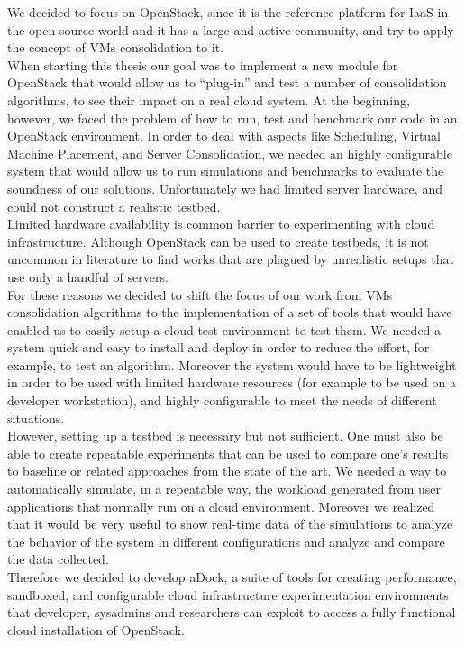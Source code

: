We decided to focus on OpenStack, since it is the reference platform for IaaS in the open-source world and it has a large and active community, and try to apply the concept of VMs consolidation to it.\\ 
When starting this thesis our goal was to implement a new module for OpenStack that would allow us to ``plug-in'' and test a number of consolidation algorithms, to see their impact on a real cloud system. At the beginning, however, we faced the problem of how to run, test and benchmark our code in an OpenStack environment. In order to deal with aspects like Scheduling, Virtual Machine Placement, and Server Consolidation, we needed an highly configurable system that would allow us to run simulations and benchmarks to evaluate the soundness of our solutions. Unfortunately we had limited server hardware, and could not construct a realistic testbed.\\
Limited hardware availability is common barrier to experimenting with cloud infrastructure. Although OpenStack can be used to create testbeds, it is not uncommon in literature to find works that are plagued by unrealistic setups that use only a handful of servers.\\
For these reasons we decided to shift the focus of our work from VMs consolidation algorithms to the implementation of a set of tools that would have enabled us to easily setup a cloud test environment to test them. We needed a system quick and easy to install and deploy in order to reduce the effort, for example, to test an algorithm. Moreover the system would have to be lightweight in order to be used with limited hardware resources (for example to be used on a developer workstation), and highly configurable to meet the needs of different situations.\\
However, setting up a testbed is necessary but not sufficient. One must also be able to create repeatable experiments that can be used to compare one’s results to baseline or related approaches from the state of the art. We needed a way to automatically simulate, in a repeatable way, the workload generated from user applications that normally run on a cloud environment. Moreover we realized that it would be very useful to show real-time data of the simulations to analyze the behavior of the system in different configurations and analyze and compare the data collected.\\
Therefore we decided to develop aDock, a suite of tools for creating performance, sandboxed, and configurable cloud infrastructure experimentation environments that developer, sysadmins and researchers can exploit to access a fully functional cloud installation of OpenStack.

